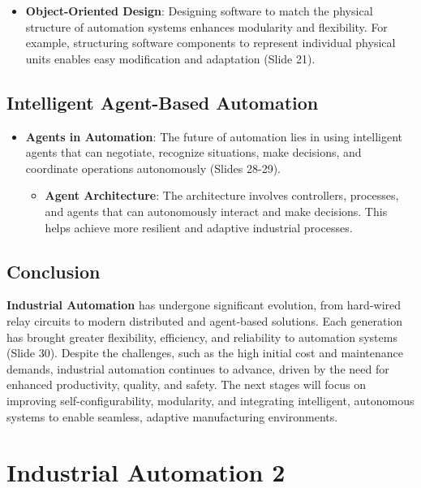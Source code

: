 \documentclass[
  14pt,
  a4paper,
  numbers=noendperiod,
  headinclude=true,
  footinclude=true,
  DIV=calc]{scrreprt}
\providecommand{\tightlist}{%
  \setlength{\itemsep}{0pt}\setlength{\parskip}{0pt}}\usepackage{longtable,booktabs,array}
\begin{document}
\begin{itemize}
\tightlist
\item
  \textbf{Object-Oriented Design}: Designing software to match the
  physical structure of automation systems enhances modularity and
  flexibility. For example, structuring software components to represent
  individual physical units enables easy modification and adaptation
  (Slide 21).
\end{itemize}

\section{Intelligent Agent-Based
Automation}\label{intelligent-agent-based-automation}

\begin{itemize}
\tightlist
\item
  \textbf{Agents in Automation}: The future of automation lies in using
  intelligent agents that can negotiate, recognize situations, make
  decisions, and coordinate operations autonomously (Slides 28-29).

  \begin{itemize}
  \tightlist
  \item
    \textbf{Agent Architecture}: The architecture involves controllers,
    processes, and agents that can autonomously interact and make
    decisions. This helps achieve more resilient and adaptive industrial
    processes.
  \end{itemize}
\end{itemize}

\section{Conclusion}\label{conclusion-8}

\textbf{Industrial Automation} has undergone significant evolution, from
hard-wired relay circuits to modern distributed and agent-based
solutions. Each generation has brought greater flexibility, efficiency,
and reliability to automation systems (Slide 30). Despite the
challenges, such as the high initial cost and maintenance demands,
industrial automation continues to advance, driven by the need for
enhanced productivity, quality, and safety. The next stages will focus
on improving self-configurability, modularity, and integrating
intelligent, autonomous systems to enable seamless, adaptive
manufacturing environments.

\chapter{Industrial Automation 2}\label{industrial-automation-2}
\end{document}
